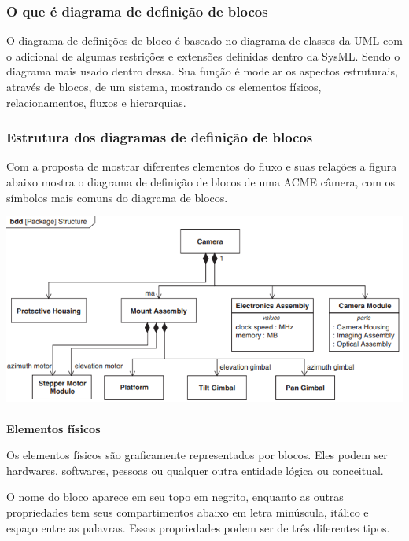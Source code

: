 \subsubsection{O que é diagrama de definição de blocos}

O diagrama de definições de bloco é baseado no diagrama de classes da UML com o adicional de algumas restrições e extensões definidas dentro da SysML. Sendo o diagrama mais usado dentro dessa. Sua função é modelar os aspectos estruturais, através de blocos, de um sistema, mostrando os elementos físicos, relacionamentos, fluxos e hierarquias.

\subsubsection{Estrutura dos diagramas de definição de blocos}

Com a proposta de mostrar diferentes elementos do fluxo e suas relações a figura abaixo mostra o diagrama de definição de blocos de uma ACME câmera, com os símbolos mais comuns do diagrama de blocos.

\includegraphics[width=\textwidth,height=\textheight,keepaspectratio]{figures/diagrama de blocos.PNG}

\paragraph{}
 \textbf{Elementos físicos} 
 
 
Os elementos físicos são graficamente representados por blocos. Eles podem ser hardwares, softwares, pessoas ou qualquer outra entidade lógica ou conceitual. 

O nome do bloco aparece em seu topo em negrito, enquanto as outras propriedades tem seus compartimentos abaixo em letra minúscula, itálico e espaço entre as palavras. Essas propriedades podem ser de três diferentes tipos. 

